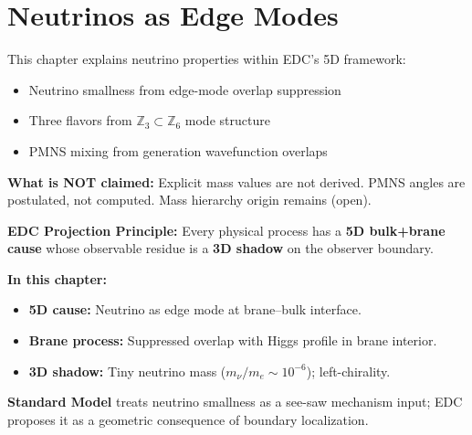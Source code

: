 
\section{Neutrinos as Edge Modes}
\label{sec:ch6_neutrinos}

\begin{tcolorbox}[edcGuardrail, title=\textbf{Epistemic Status}]
This chapter explains neutrino properties within EDC's 5D framework:
\begin{itemize}[nosep]
    \item Neutrino smallness from edge-mode overlap suppression \tagDc{}
    \item Three flavors from $\mathbb{Z}_3 \subset \mathbb{Z}_6$ mode structure \tagI{}
    \item PMNS mixing from generation wavefunction overlaps \tagP{}
\end{itemize}
\textbf{What is NOT claimed:} Explicit mass values are not derived. PMNS angles
are postulated, not computed. Mass hierarchy origin remains (open).
\end{tcolorbox}

\begin{tcolorbox}[colback=blue!3!white, colframe=blue!50!black,
    title=\textbf{Framework 2.0 Language Compliance}]
\small
\textbf{EDC Projection Principle:} Every physical process has a \textbf{5D bulk+brane cause}
whose observable residue is a \textbf{3D shadow} on the observer boundary.

\textbf{In this chapter:}
\begin{itemize}[nosep]
    \item \textbf{5D cause:} Neutrino as edge mode at brane–bulk interface.
    \item \textbf{Brane process:} Suppressed overlap with Higgs profile in brane interior.
    \item \textbf{3D shadow:} Tiny neutrino mass ($m_\nu/m_e \sim 10^{-6}$); left-chirality.
\end{itemize}

\textbf{Standard Model} treats neutrino smallness as a see-saw mechanism input;
EDC proposes it as a geometric consequence of boundary localization.
\end{tcolorbox}

